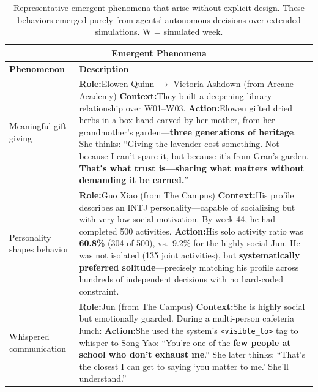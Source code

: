 \begin{table}[t]
\centering
\small
\caption{Representative emergent phenomena that arise without explicit design. These behaviors emerged purely from agents' autonomous decisions over extended simulations. W = simulated week.}
\label{tab:emergent}
\begin{tabular}{p{0.8in}p{4.3in}}
\toprule
\multicolumn{2}{c}{\textbf{Emergent Phenomena}} \\
\midrule
\textbf{Phenomenon} & \textbf{Description} \\
\midrule

Meaningful \newline gift-giving
&
\textbf{Role:}\quad Elowen Quinn $\to$ Victoria Ashdown \hfill (from Arcane Academy) \newline
\textbf{Context:}\quad They built a deepening library relationship over W01--W03. \newline
\textbf{Action:}\quad Elowen gifted dried herbs in a box hand-carved by her mother, from her grandmother's garden---\textbf{three generations of heritage}. She thinks: ``Giving the lavender cost something. Not because I can't spare it, but because it's from Gran's garden. \textbf{That's what trust is---sharing what matters without demanding it be earned.}''
\\
\midrule

Personality \newline shapes \newline behavior
&
\textbf{Role:}\quad Guo Xiao \hfill (from The Campus) \newline
\textbf{Context:}\quad His profile describes an INTJ personality---capable of socializing but with very low social motivation. By week 44, he had completed 500 activities. \newline
\textbf{Action:}\quad His solo activity ratio was \textbf{60.8\%} (304 of 500), vs.\ 9.2\% for the highly social Jun. He was not isolated (135 joint activities), but \textbf{systematically preferred solitude}---precisely matching his profile across hundreds of independent decisions with no hard-coded constraint.
\\
\midrule

Whispered \newline communication
&
\textbf{Role:}\quad Jun \hfill (from The Campus) \newline
\textbf{Context:}\quad She is highly social but emotionally guarded. During a multi-person cafeteria lunch: \newline
\textbf{Action:}\quad She used the system's \texttt{<visible\_to>} tag to whisper to Song Yao: ``You're one of the \textbf{few people at school who don't exhaust me}.'' She later thinks: ``That's the closest I can get to saying `you matter to me.' She'll understand.''
\\
\midrule


\end{tabular}
\end{table}
